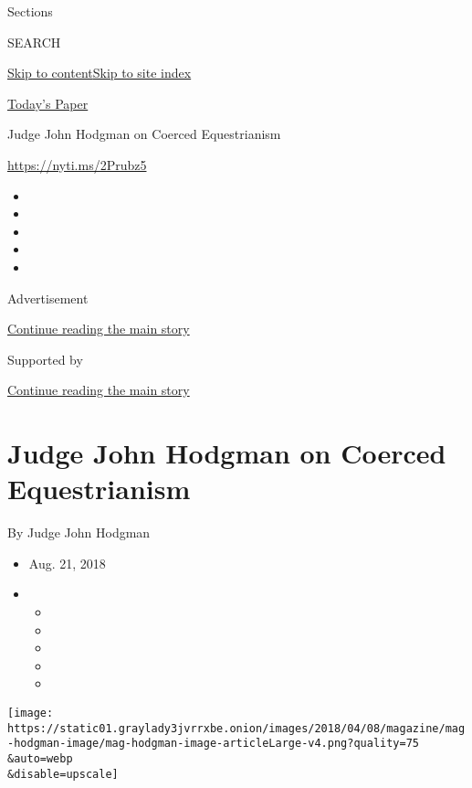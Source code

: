 Sections

SEARCH

\protect\hyperlink{site-content}{Skip to
content}\protect\hyperlink{site-index}{Skip to site index}

\href{https://myaccount.nytimes3xbfgragh.onion/auth/login?response_type=cookie\&client_id=vi}{}

\href{https://www.nytimes3xbfgragh.onion/section/todayspaper}{Today's
Paper}

Judge John Hodgman on Coerced Equestrianism

\url{https://nyti.ms/2Prubz5}

\begin{itemize}
\item
\item
\item
\item
\item
\end{itemize}

Advertisement

\protect\hyperlink{after-top}{Continue reading the main story}

Supported by

\protect\hyperlink{after-sponsor}{Continue reading the main story}

\hypertarget{judge-john-hodgman-on-coerced-equestrianism}{%
\section{Judge John Hodgman on Coerced
Equestrianism}\label{judge-john-hodgman-on-coerced-equestrianism}}

By Judge John Hodgman

\begin{itemize}
\item
  Aug. 21, 2018
\item
  \begin{itemize}
  \item
  \item
  \item
  \item
  \item
  \end{itemize}
\end{itemize}

\texttt{[image: https://static01.graylady3jvrrxbe.onion/images/2018/04/08/magazine/mag-hodgman-image/mag-hodgman-image-articleLarge-v4.png?quality=75\\\&auto=webp\\\&disable=upscale]}

